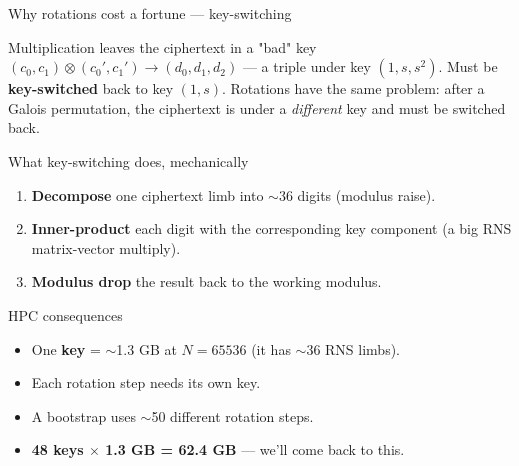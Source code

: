 \documentclass[aspectratio=169]{beamer}
\begin{document}
\begin{frame}{Why rotations cost a fortune — key-switching}
  \begin{block}{Multiplication leaves the ciphertext in a "bad" key}
    \footnotesize
    $(c_0, c_1) \otimes (c_0', c_1') \to (d_0, d_1, d_2)$ — a triple under
    key $(1, s, s^2)$. Must be \textbf{key-switched} back to key $(1, s)$.
    Rotations have the same problem: after a Galois permutation, the
    ciphertext is under a \emph{different} key and must be switched back.
  \end{block}
  \pause
  \begin{block}{What key-switching does, mechanically}
    \footnotesize
    \begin{enumerate}
      \item \textbf{Decompose} one ciphertext limb into $\sim$36 digits (modulus raise).
      \item \textbf{Inner-product} each digit with the corresponding
            key component (a big RNS matrix-vector multiply).
      \item \textbf{Modulus drop} the result back to the working modulus.
    \end{enumerate}
  \end{block}
  \pause
  \begin{alertblock}{HPC consequences}
    \footnotesize
    \begin{itemize}
      \item One \textbf{key} = $\sim$1.3 GB at $N{=}65536$ (it has $\sim$36 RNS limbs).
      \item Each rotation step needs its own key.
      \item A bootstrap uses $\sim$50 different rotation steps.
      \item \textbf{48 keys $\times$ 1.3 GB = 62.4 GB} — we'll come back to this.
    \end{itemize}
  \end{alertblock}
\end{frame}
\end{document}
